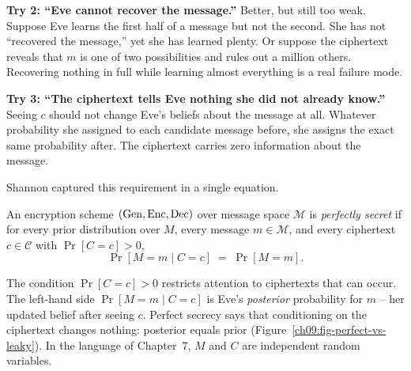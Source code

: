 \textbf{Try 2: ``Eve cannot recover the message.''} Better, but still too weak. Suppose Eve learns the first half of a message but not the second. She has not ``recovered the message,'' yet she has learned plenty. Or suppose the ciphertext reveals that $m$ is one of two possibilities and rules out a million others. Recovering nothing in full while learning almost everything is a real failure mode.

\textbf{Try 3: ``The ciphertext tells Eve nothing she did not already know.''} Seeing $c$ should not change Eve's beliefs about the message at all. Whatever probability she assigned to each candidate message before, she assigns the exact same probability after. The ciphertext carries zero information about the message.

Shannon captured this requirement in a single equation.

\begin{definition}
\label{ch09:perfect-def}
An encryption scheme $(\operatorname{Gen},\operatorname{Enc},\operatorname{Dec})$ over message space $\mathcal{M}$ is \emph{perfectly secret} if for every prior distribution over $M$, every message $m \in \mathcal{M}$, and every ciphertext $c \in \mathcal{C}$ with $\Pr[C = c] > 0$,
\[
  \Pr[M = m \mid C = c] \;=\; \Pr[M = m].
\]
\end{definition}

The condition $\Pr[C = c] > 0$ restricts attention to ciphertexts that can occur. The left-hand side $\Pr[M = m \mid C = c]$ is Eve's \emph{posterior} probability for $m$ -- her updated belief after seeing $c$. Perfect secrecy says that conditioning on the ciphertext changes nothing: posterior equals prior (Figure~\ref{ch09:fig-perfect-vs-leaky}). In the language of Chapter~7, $M$ and $C$ are independent random variables.

